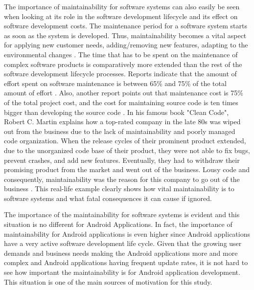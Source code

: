 The importance of maintainability for software systems can also easily be seen when looking at its role in the software development lifecycle and its effect on software development costs. The maintenance period for a software system starts as soon as the system is developed. Thus, maintainability becomes a vital aspect for applying new customer needs, adding/removing new features, adapting to the environmental changes \cite{23}. The time that has to be spent on the maintenance of complex software products is comparatively more extended than the rest of the software development lifecycle processes. Reports indicate that the amount of effort spent on software maintenance is between 65\% and 75\% of the total amount of effort \cite{13}. Also, another report points out that maintenance cost is 75\% of the total project cost, and the cost for maintaining source code is ten times bigger than developing the source code \cite{22}. In his famous book "Clean Code", Robert C. Martin explains how a top-rated company in the late 80s was wiped out from the business due to the lack of maintainability and poorly managed code organization. When the release cycles of their prominent product extended, due to the unorganized code base of their product, they were not able to fix bugs, prevent crashes, and add new features. Eventually, they had to withdraw their promising product from the market and went out of the business. Lousy code and consequently, maintainability was the reason for this company to go out of the business \cite{11}. This real-life example clearly shows how vital maintainability is to software systems and what fatal consequences it can cause if ignored.

The importance of the maintainability for software systems is evident and this situation is no different for Android Applications. In fact, the importance of maintainability for Android applications is even higher since Android applications have a very active software development life cycle. Given that the growing user demands and business needs making the Android applications more and more complex and Android applications having frequent update rates, it is not hard to see how important the maintainability is for Android application development. This situation is one of the main sources of motivation for this study. 

